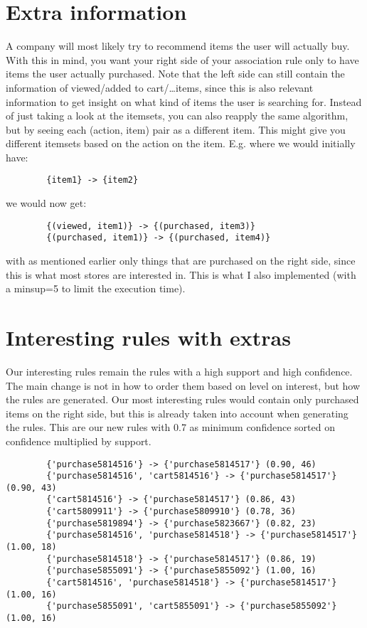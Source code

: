\documentclass{article}
\begin{document}
    \section{Extra information}
    A company will most likely try to recommend items the user will actually buy.
    With this in mind, you want your right side of your association rule only to have items the user actually purchased.
    Note that the left side can still contain the information of viewed/added to cart/\ldots items, since this is also relevant information to get insight on what kind of items the user is searching for.
    Instead of just taking a look at the itemsets, you can also reapply the same algorithm, but by seeing each (action, item) pair as a different item.
    This might give you different itemsets based on the action on the item.
    E.g. where we would initially have:
    \begin{verbatim}
        {item1} -> {item2}
    \end{verbatim}
    we would now get:
    \begin{verbatim}
        {(viewed, item1)} -> {(purchased, item3)}
        {(purchased, item1)} -> {(purchased, item4)}
    \end{verbatim}
    with as mentioned earlier only things that are purchased on the right side, since this is what most stores are interested in.
    This is what I also implemented (with a minsup=5 to limit the execution time).

    \section{Interesting rules with extras}
    Our interesting rules remain the rules with a high support and high confidence.
    The main change is not in how to order them based on level on interest, but how the rules are generated.
    Our most interesting rules would contain only purchased items on the right side, but this is already taken into account when generating the rules.
    This are our new rules with 0.7 as minimum confidence sorted on confidence multiplied by support.
    \begin{verbatim}
        {'purchase5814516'} -> {'purchase5814517'} (0.90, 46)
        {'purchase5814516', 'cart5814516'} -> {'purchase5814517'} (0.90, 43)
        {'cart5814516'} -> {'purchase5814517'} (0.86, 43)
        {'cart5809911'} -> {'purchase5809910'} (0.78, 36)
        {'purchase5819894'} -> {'purchase5823667'} (0.82, 23)
        {'purchase5814516', 'purchase5814518'} -> {'purchase5814517'} (1.00, 18)
        {'purchase5814518'} -> {'purchase5814517'} (0.86, 19)
        {'purchase5855091'} -> {'purchase5855092'} (1.00, 16)
        {'cart5814516', 'purchase5814518'} -> {'purchase5814517'} (1.00, 16)
        {'purchase5855091', 'cart5855091'} -> {'purchase5855092'} (1.00, 16)
    \end{verbatim}
\end{document}
